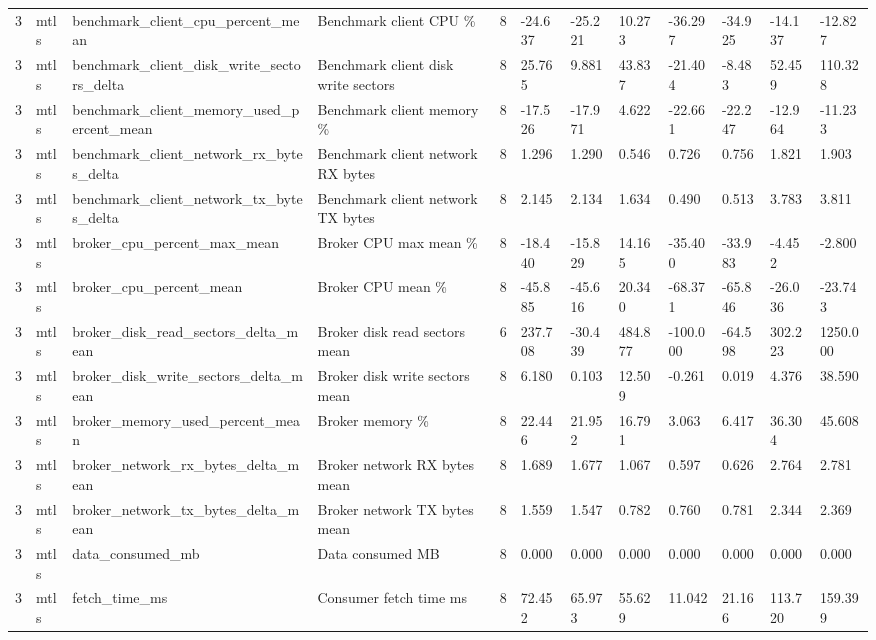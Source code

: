 \begin{longtable}{llllllllllll}
3 & mtls & benchmark\_client\_cpu\_percent\_mean & Benchmark client CPU \% & 8 & -24.637 & -25.221 & 10.273 & -36.297 & -34.925 & -14.137 & -12.827 \\
3 & mtls & benchmark\_client\_disk\_write\_sectors\_delta & Benchmark client disk write sectors & 8 & 25.765 & 9.881 & 43.837 & -21.404 & -8.483 & 52.459 & 110.328 \\
3 & mtls & benchmark\_client\_memory\_used\_percent\_mean & Benchmark client memory \% & 8 & -17.526 & -17.971 & 4.622 & -22.661 & -22.247 & -12.964 & -11.233 \\
3 & mtls & benchmark\_client\_network\_rx\_bytes\_delta & Benchmark client network RX bytes & 8 & 1.296 & 1.290 & 0.546 & 0.726 & 0.756 & 1.821 & 1.903 \\
3 & mtls & benchmark\_client\_network\_tx\_bytes\_delta & Benchmark client network TX bytes & 8 & 2.145 & 2.134 & 1.634 & 0.490 & 0.513 & 3.783 & 3.811 \\
3 & mtls & broker\_cpu\_percent\_max\_mean & Broker CPU max mean \% & 8 & -18.440 & -15.829 & 14.165 & -35.400 & -33.983 & -4.452 & -2.800 \\
3 & mtls & broker\_cpu\_percent\_mean & Broker CPU mean \% & 8 & -45.885 & -45.616 & 20.340 & -68.371 & -65.846 & -26.036 & -23.743 \\
3 & mtls & broker\_disk\_read\_sectors\_delta\_mean & Broker disk read sectors mean & 6 & 237.708 & -30.439 & 484.877 & -100.000 & -64.598 & 302.223 & 1250.000 \\
3 & mtls & broker\_disk\_write\_sectors\_delta\_mean & Broker disk write sectors mean & 8 & 6.180 & 0.103 & 12.509 & -0.261 & 0.019 & 4.376 & 38.590 \\
3 & mtls & broker\_memory\_used\_percent\_mean & Broker memory \% & 8 & 22.446 & 21.952 & 16.791 & 3.063 & 6.417 & 36.304 & 45.608 \\
3 & mtls & broker\_network\_rx\_bytes\_delta\_mean & Broker network RX bytes mean & 8 & 1.689 & 1.677 & 1.067 & 0.597 & 0.626 & 2.764 & 2.781 \\
3 & mtls & broker\_network\_tx\_bytes\_delta\_mean & Broker network TX bytes mean & 8 & 1.559 & 1.547 & 0.782 & 0.760 & 0.781 & 2.344 & 2.369 \\
3 & mtls & data\_consumed\_mb & Data consumed MB & 8 & 0.000 & 0.000 & 0.000 & 0.000 & 0.000 & 0.000 & 0.000 \\
3 & mtls & fetch\_time\_ms & Consumer fetch time ms & 8 & 72.452 & 65.973 & 55.629 & 11.042 & 21.166 & 113.720 & 159.399 \\

\end{longtable}
